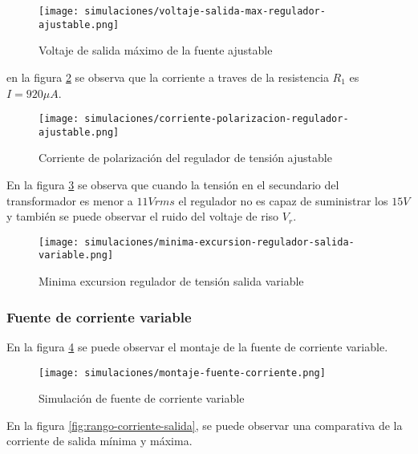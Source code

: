\begin{figure}[ht]
    \centering
    \texttt{[image: simulaciones/voltaje-salida-max-regulador-ajustable.png]}
    \caption{Voltaje de salida máximo de la fuente ajustable}
    \label{fig:voltaje-salida-max-regulador-ajustable}
\end{figure}

en la figura \ref{fig:corriente-polarizacion-regulador-ajustable} se observa que la corriente a traves de la resistencia $R_1$ es $I = 920 \mu A$.

\begin{figure}
    \centering
    \texttt{[image: simulaciones/corriente-polarizacion-regulador-ajustable.png]}
    \caption{Corriente de polarización del regulador de tensión ajustable}
    \label{fig:corriente-polarizacion-regulador-ajustable}
\end{figure}

En la figura \ref{fig:minima-excursion-regulador-salida-variable} se observa que cuando la tensión en el secundario del transformador es menor a $11 Vrms$ el regulador no es capaz de suministrar los $15V$ y también se puede observar el ruido del voltaje de riso $V_r$.

\begin{figure}
    \centering
    \texttt{[image: simulaciones/minima-excursion-regulador-salida-variable.png]}
    \caption{Minima excursion regulador de tensión salida variable}
    \label{fig:minima-excursion-regulador-salida-variable}
\end{figure}

\FloatBarrier
\subsubsection*{Fuente de corriente variable}

En la figura \ref{fig:simulacion-fuente-corriente} se puede observar el montaje de la fuente de corriente variable.

\begin{figure}[ht]
    \centering
    \texttt{[image: simulaciones/montaje-fuente-corriente.png]}
    \caption{Simulación de fuente de corriente variable}
    \label{fig:simulacion-fuente-corriente}
\end{figure}

En la figura \ref{fig:rango-corriente-salida}, se puede observar una comparativa de la corriente de salida mínima y máxima.

